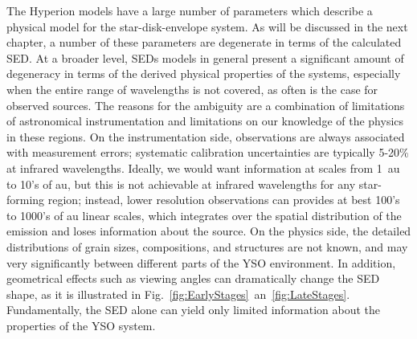 
The Hyperion models \citep{Robitaille:2011fc} have a large number of parameters which describe a physical model for the star-disk-envelope system. As will be discussed in the next chapter, a number of these parameters are degenerate in terms of the calculated SED. At a broader level,
SEDs models in general present a significant amount of degeneracy in terms of the derived physical properties of the systems, especially when the entire range of wavelengths is not covered, as often is the case for observed sources. The reasons for the ambiguity are a combination of limitations of astronomical instrumentation and limitations on our knowledge of the physics in these regions. On the instrumentation side, observations are always associated with measurement errors; systematic calibration uncertainties are typically 5-20\% at infrared wavelengths. Ideally, we would want information at scales from 1~\si{au} to 10's of \si{au}, but this is not achievable at infrared wavelengths for any star-forming region; instead, lower resolution observations can provides at best 100's to 1000's of \si{au} linear scales, which integrates over the spatial distribution of the emission and loses information about the source. On the physics side, the detailed distributions of grain sizes, compositions, and structures
are not known, and may very significantly between different parts of the YSO environment. In addition, geometrical effects such as viewing angles can dramatically change the SED shape, as it is illustrated in Fig.~\ref{fig:EarlyStages}~an~\ref{fig:LateStages}. Fundamentally, the SED alone can yield only limited information about the properties of the YSO system.


